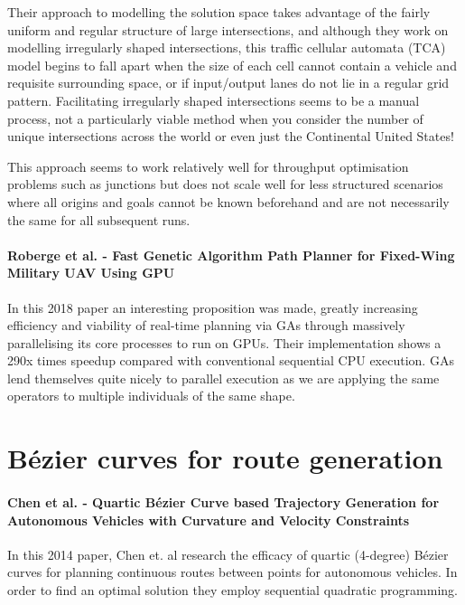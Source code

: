 Their approach to modelling the solution space takes advantage of the fairly uniform and regular structure of large intersections, and although they work on modelling irregularly shaped intersections, this traffic cellular automata (TCA) model begins to fall apart when the size of each cell cannot contain a vehicle and requisite surrounding space, or if input/output lanes do not lie in a regular grid pattern. Facilitating irregularly shaped intersections seems to be a manual process, not a particularly viable method when you consider the number of unique intersections across the world or even just the Continental United States!

This approach seems to work relatively well for throughput optimisation problems such as junctions but does not scale well for less structured scenarios where all origins and goals cannot be known beforehand and are not necessarily the same for all subsequent runs.

\paragraph{Roberge et al. - Fast Genetic Algorithm Path Planner for Fixed-Wing Military UAV Using GPU\cite{robergeFastGeneticAlgorithm2018}}

In this 2018 paper an interesting proposition was made, greatly increasing efficiency and viability of real-time planning via GAs through massively parallelising its core processes to run on GPUs. Their implementation shows a 290x times speedup compared with conventional sequential CPU execution. GAs lend themselves quite nicely to parallel execution as we are applying the same operators to multiple individuals of the same shape.

\section{Bézier curves for route generation}

\paragraph{Chen et al. - Quartic Bézier Curve based Trajectory Generation for Autonomous Vehicles with Curvature and Velocity Constraints}

In this 2014 paper, Chen et. al research the efficacy of quartic (4-degree) Bézier curves for planning continuous routes between points for autonomous vehicles. In order to find an optimal solution they employ sequential quadratic programming.

